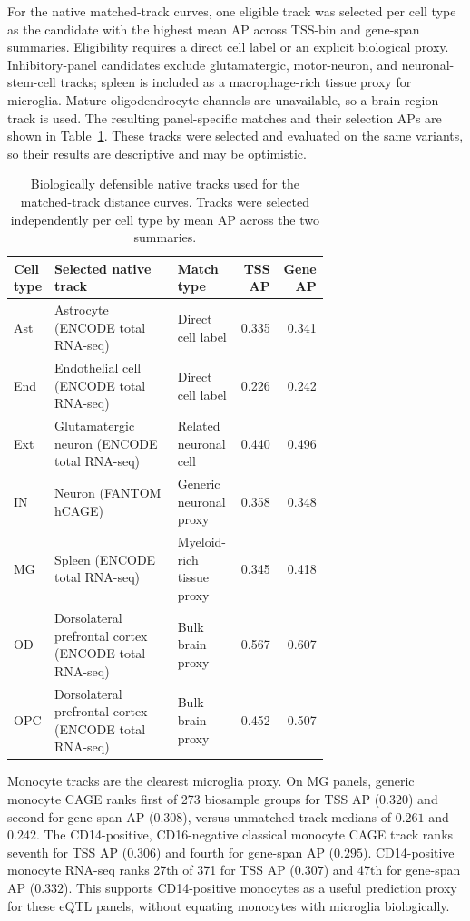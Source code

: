 \documentclass[11pt]{article}
\begin{document}
For the native matched-track curves, one eligible track was selected per cell
type as the candidate with the highest mean AP across TSS-bin and gene-span
summaries. Eligibility requires a direct cell label or an explicit biological
proxy. Inhibitory-panel candidates exclude glutamatergic, motor-neuron, and
neuronal-stem-cell tracks; spleen is included as a macrophage-rich tissue proxy
for microglia. Mature oligodendrocyte channels are unavailable, so a brain-region
track is used. The resulting panel-specific matches and their selection APs
are shown in Table~\ref{tab:native_biological_matches}. These tracks were
selected and evaluated on the same variants, so their results are descriptive
and may be optimistic.

\begin{table}[ht]
\centering
\scriptsize
\caption{Biologically defensible native tracks used for the matched-track
distance curves. Tracks were selected independently per cell type by mean AP
across the two summaries.}
\label{tab:native_biological_matches}
\begin{tabular}{@{}p{0.10\linewidth}p{0.39\linewidth}p{0.20\linewidth}rr@{}}
\toprule
Cell type & Selected native track & Match type & TSS AP & Gene AP \\
\midrule
Ast & Astrocyte (ENCODE total RNA-seq) & Direct cell label & 0.335 & 0.341 \\
End & Endothelial cell (ENCODE total RNA-seq) & Direct cell label & 0.226 & 0.242 \\
Ext & Glutamatergic neuron (ENCODE total RNA-seq) & Related neuronal cell & 0.440 & 0.496 \\
IN & Neuron (FANTOM hCAGE) & Generic neuronal proxy & 0.358 & 0.348 \\
MG & Spleen (ENCODE total RNA-seq) & Myeloid-rich tissue proxy & 0.345 & 0.418 \\
OD & Dorsolateral prefrontal cortex (ENCODE total RNA-seq) & Bulk brain proxy & 0.567 & 0.607 \\
OPC & Dorsolateral prefrontal cortex (ENCODE total RNA-seq) & Bulk brain proxy & 0.452 & 0.507 \\
\bottomrule
\end{tabular}
\end{table}

Monocyte tracks are the clearest microglia proxy. On MG panels, generic
monocyte CAGE ranks first of 273 biosample groups for TSS AP ($0.320$) and
second for gene-span AP ($0.308$), versus unmatched-track medians of $0.261$
and $0.242$. The CD14-positive, CD16-negative classical monocyte CAGE track
ranks seventh for TSS AP ($0.306$) and fourth for gene-span AP ($0.295$).
CD14-positive monocyte RNA-seq ranks 27th of 371 for TSS AP ($0.307$) and 47th
for gene-span AP ($0.332$). This supports CD14-positive monocytes as a useful
prediction proxy for these eQTL panels, without equating monocytes with
microglia biologically.
\end{document}
